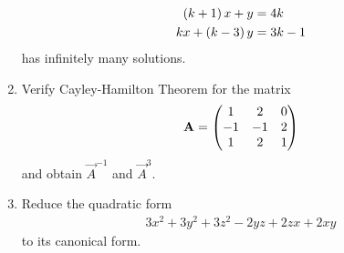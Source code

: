\documentclass[journal,12pt,twocolumn]{IEEEtran}
\renewcommand\thesection{\arabic{section}}
\begin{document}
\begin{enumerate}[label=\thesection.\arabic*.,ref=\thesection.\theenumi]
\begin{align}
	\left(k+1\right)x+y &= 4k
	\\
	kx+\left(k-3\right)y &= 3k-1
\end{align}
has infinitely many solutions.
\item Verify Cayley-Hamilton Theorem for the matrix 
\begin{align}
	\mathbf{A} = 	\begin{pmatrix}1 & 2 & 0\\-1 & -1 & 2 \\ 1 & 2 & 1\end{pmatrix}
\end{align}
		and obtain $\vec{A}^{-1}$ and $\vec{A}^{3}$.
	\item Reduce the quadratic form 
\begin{align}
	3x^2+3y^2+3z^2-2yz+2zx+2xy
\end{align}
to its canonical form.

\end{enumerate}
\end{document}
